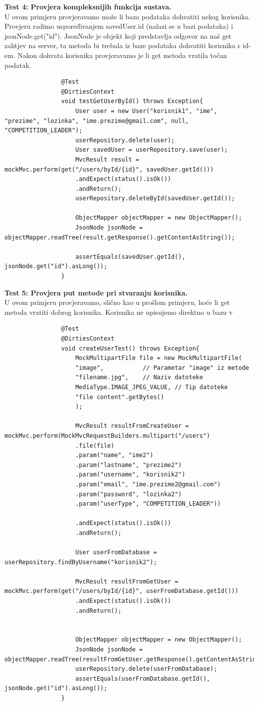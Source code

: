 			\textbf{Test 4: Provjera kompleksnijih funkcija sustava.}\\
			U ovom primjeru provjeravamo može li baza podataka dohvatiti nekog korisnika. Provjeru radimo uspoređivanjem savedUser.id (nalazi se u bazi podataka) i jsonNode.get("id"). JsonNode je objekt koji predstavlja odgovor na naš get zahtjev na server, ta metoda bi trebala iz baze podataka dohvatiti korisnika s id-em. Nakon dohvata korisnika provjeravamo je li get metoda vratila točan podatak. 
			\begin{lstlisting}
				@Test
				@DirtiesContext
				void testGetUserById() throws Exception{
					User user = new User("korisnik1", "ime", "prezime", "lozinka", "ime.prezime@gmail.com", null, "COMPETITION_LEADER");
					userRepository.delete(user);
					User savedUser = userRepository.save(user);
					MvcResult result = mockMvc.perform(get("/users/byId/{id}", savedUser.getId()))
					.andExpect(status().isOk())
					.andReturn();
					userRepository.deleteById(savedUser.getId());
					
					ObjectMapper objectMapper = new ObjectMapper();
					JsonNode jsonNode = objectMapper.readTree(result.getResponse().getContentAsString());
					
					assertEquals(savedUser.getId(), jsonNode.get("id").asLong());
				}
			\end{lstlisting}
			
			\textbf{Test 5: Provjera put metode pri stvaranju korisnika.}\\
			U ovom primjeru provjeravamo, slično kao u prošlom primjeru, hoće li get metoda vratiti dobrog korisnika. Korisnika ne upisujemo direktno u bazu v
			\begin{lstlisting}
				@Test
				@DirtiesContext
				void createUserTest() throws Exception{
					MockMultipartFile file = new MockMultipartFile(
					"image",           // Parametar "image" iz metode
					"filename.jpg",    // Naziv datoteke
					MediaType.IMAGE_JPEG_VALUE, // Tip datoteke
					"file content".getBytes()   
					);
					
					MvcResult resultFromCreateUser = mockMvc.perform(MockMvcRequestBuilders.multipart("/users")
					.file(file)
					.param("name", "ime2")
					.param("lastname", "prezime2")
					.param("username", "korisnik2")
					.param("email", "ime.prezime2@gmail.com")
					.param("password", "lozinka2")
					.param("userType", "COMPETITION_LEADER"))
					
					.andExpect(status().isOk())
					.andReturn();
					
					User userFromDatabase = userRepository.findByUsername("korisnik2");
					
					MvcResult resultFromGetUser = mockMvc.perform(get("/users/byId/{id}", userFromDatabase.getId()))
					.andExpect(status().isOk())
					.andReturn();
					
					
					ObjectMapper objectMapper = new ObjectMapper();
					JsonNode jsonNode = objectMapper.readTree(resultFromGetUser.getResponse().getContentAsString());
					userRepository.delete(userFromDatabase);
					assertEquals(userFromDatabase.getId(), jsonNode.get("id").asLong());
				}
			\end{lstlisting}
			
